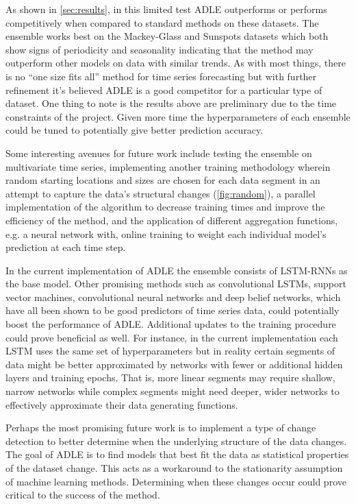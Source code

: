 \documentclass{article}
\begin{document}
As shown in \autoref{sec:results}, in this limited test ADLE outperforms or performs competitively when compared to standard methods on these datasets. The ensemble works best on the Mackey-Glass and Sunspots datasets which both show signs of periodicity and seasonality indicating that the method may outperform other models on data with similar trends. As with most things, there is no ``one size fits all'' method for time series forecasting but with further refinement it's believed ADLE is a good competitor for a particular type of dataset.  
One thing to note is the results above are preliminary due to the time constraints of the project. Given more time the hyperparameters of each ensemble could be tuned to potentially give better prediction accuracy. 

Some interesting avenues for future work include testing the ensemble on multivariate time series, implementing another training methodology wherein random starting locations and sizes are chosen for each data segment in an attempt to capture the data's structural changes (\autoref{fig:random}), a parallel implementation of the algorithm to decrease training times and improve the efficiency of the method, and the application of different aggregation functions, e.g. a neural network with, online training to weight each individual model's prediction at each time step.

In the current implementation of ADLE the ensemble consists of LSTM-RNNs as the base model. Other promising methods such as convolutional LSTMs, support vector machines, convolutional neural networks and deep belief networks, which have all been shown to be good predictors of time series data, could potentially boost the performance of ADLE. Additional updates to the training procedure could prove beneficial as well. For instance, in the current implementation each LSTM uses the same set of hyperparameters but in reality certain segments of data might be better approximated by networks with fewer or additional hidden layers and training epochs. That is, more linear segments may require shallow, narrow networks while complex segments might need deeper, wider networks to effectively approximate their data generating functions.

Perhaps the most promising future work is to implement a type of change detection to better determine when the underlying structure of the data changes. The goal of ADLE is to find models that best fit the data as statistical properties of the dataset change. This acts as a workaround to the stationarity assumption of machine learning methods. Determining when these changes occur could prove critical to the success of the method. 
  
\end{document}
